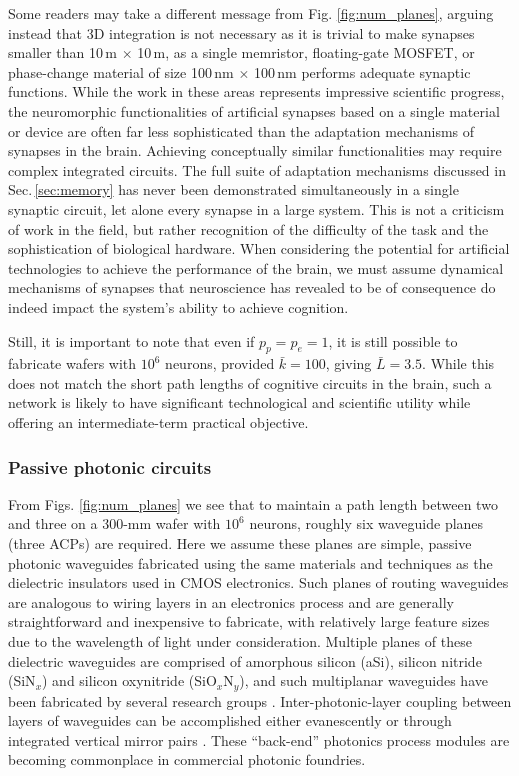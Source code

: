 \documentclass[twocolumn]{article}
\begin{document}
Some readers may take a different message from Fig. \ref{fig:num_planes}, arguing instead that 3D integration is not necessary as it is trivial to make synapses smaller than 10\,\textmu m $\times$ 10\,\textmu m, as a single memristor, floating-gate MOSFET, or phase-change material of size 100\,nm $\times$ 100\,nm performs adequate synaptic functions. While the work in these areas represents impressive scientific progress, the neuromorphic functionalities of artificial synapses based on a single material or device are often far less sophisticated than the adaptation mechanisms of synapses in the brain.  Achieving conceptually similar functionalities may require complex integrated circuits. The full suite of adaptation mechanisms discussed in Sec.\,\ref{sec:memory} has never been demonstrated simultaneously in a single synaptic circuit, let alone every synapse in a large system. This is not a criticism of work in the field, but rather recognition of the difficulty of the task and the sophistication of biological hardware. When considering the potential for artificial technologies to achieve the performance of the brain, we must assume dynamical mechanisms of synapses that neuroscience has revealed to be of consequence do indeed impact the system's ability to achieve cognition.

Still, it is important to note that even if $p_p = p_e = 1$, it is still possible to fabricate wafers with $10^6$ neurons, provided $\bar{k} = 100$, giving $\bar{L} = 3.5$. While this does not match the short path lengths of cognitive circuits in the brain, such a network is likely to have significant technological and scientific utility while offering an intermediate-term practical objective.

\subsubsection{Passive photonic circuits}
From Figs. \ref{fig:num_planes} we see that to maintain a path length between two and three on a 300-mm wafer with $10^6$ neurons, roughly six waveguide planes (three ACPs) are required. Here we assume these planes are simple, passive photonic waveguides fabricated using the same materials and techniques as the dielectric insulators used in CMOS electronics. Such planes of routing waveguides are analogous to wiring layers in an electronics process and are generally straightforward and inexpensive to fabricate, with relatively large feature sizes due to the wavelength of light under consideration. Multiple planes of these dielectric waveguides are comprised of amorphous silicon (aSi), silicon nitride (SiN$_x$) and silicon oxynitride (SiO$_x$N$_y$), and such multiplanar waveguides have been fabricated by several research groups \cite{shpa2015,sahu2015,chbu2017,zhli2018}. Inter-photonic-layer coupling between layers of waveguides can be accomplished either evanescently \cite{shpa2015,sahu2015,chbu2017} or through integrated vertical mirror pairs \cite{zhli2018}. These ``back-end'' photonics process modules are becoming commonplace in commercial photonic foundries. 
\end{document}
